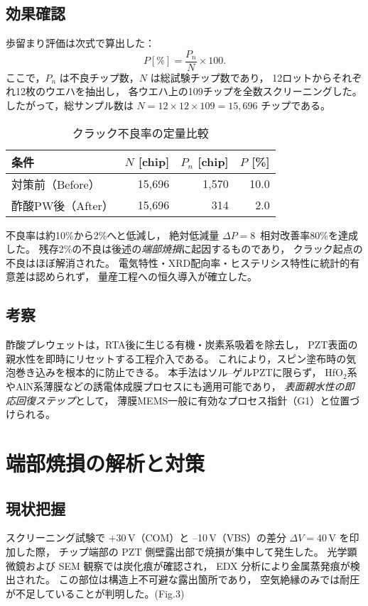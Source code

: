 \documentclass[conference]{IEEEtran}
\begin{document}
\subsection{効果確認}
歩留まり評価は次式で算出した：
\[
  P[\%] = \frac{P_n}{N} \times 100.
\]
ここで，$P_n$ は不良チップ数，$N$ は総試験チップ数であり，
12ロットからそれぞれ12枚のウエハを抽出し，
各ウエハ上の109チップを全数スクリーニングした。
したがって，総サンプル数は
$N = 12 \times 12 \times 109 = 15{,}696$ チップである。

\begin{table}[h]
  \centering
  \caption{クラック不良率の定量比較}
  \label{tab:crack-yield}
  \setlength{\tabcolsep}{4pt}
  \begin{tabular}{@{}lrrr@{}}
    \toprule
    条件 & $N$ [chip] & $P_n$ [chip] & $P$ [\%] \\
    \midrule
    対策前（Before） & 15{,}696 & 1{,}570 & 10.0 \\
    酢酸PW後（After） & 15{,}696 & 314 & 2.0 \\
    \bottomrule
  \end{tabular}
\end{table}

不良率は約10\%から2\%へと低減し，
絶対低減量 $\Delta P=8$\,%
相対改善率80\%を達成した。
残存2\%の不良は後述の\emph{端部焼損}に起因するものであり，
クラック起点の不良はほぼ解消された。
電気特性・XRD配向率・ヒステリシス特性に統計的有意差は認められず，
量産工程への恒久導入が確立した。

\subsection{考察}
酢酸プレウェットは，RTA後に生じる有機・炭素系吸着を除去し，
PZT表面の親水性を即時にリセットする工程介入である。
これにより，スピン塗布時の気泡巻き込みを根本的に防止できる。
本手法はソル–ゲルPZTに限らず，
HfO$_2$系やAlN系薄膜などの誘電体成膜プロセスにも適用可能であり，
\emph{表面親水性の即応回復ステップ}として，
薄膜MEMS一般に有効なプロセス指針（G1）と位置づけられる。

\section{端部焼損の解析と対策}
\label{sec:burnout}

\subsection{現状把握}
スクリーニング試験で +30\,V（COM）と --10\,V（VBS）の差分
$\Delta V = 40\,\mathrm{V}$ を印加した際，
チップ端部の PZT 側壁露出部で焼損が集中して発生した。
光学顕微鏡および SEM 観察では炭化痕が確認され，
EDX 分析により金属蒸発痕が検出された。
この部位は構造上不可避な露出箇所であり，
空気絶縁のみでは耐圧が不足していることが判明した。(Fig.3)
\end{document}

